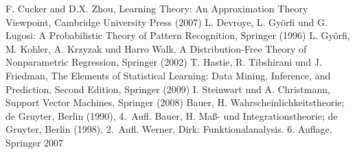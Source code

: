 \printindex

\begin{thebibliography}{50}
F. Cucker and D.X. Zhou, Learning Theory: An Approximation Theory Viewpoint, Cambridge University Press (2007)
L. Devroye, L. Györfi und G. Lugosi: A Probabilistic Theory of Pattern Recognition, Springer (1996)
L. Györfi, M. Kohler, A. Krzyzak und Harro Walk, A Distribution-Free Theory of Nonparametric Regression, Springer (2002)
T. Hastie, R. Tibshirani und J. Friedman, The Elements of Statistical Learning: Data Mining, Inference, and Prediction, Second Edition, Springer (2009)
I. Steinwart und A. Christmann, Support Vector Machines, Springer (2008)
 Bauer, H. Wahrscheinlichkeitstheorie; de Gruyter, Berlin
  (1990), 4.\ Aufl.
 Bauer, H. Maß- und Integrationstheorie; de Gruyter, Berlin
  (1998), 2.~Aufl.
 Werner, Dirk: Funktionalanalysis. 6. Auflage,
Springer 2007
\end{thebibliography}

